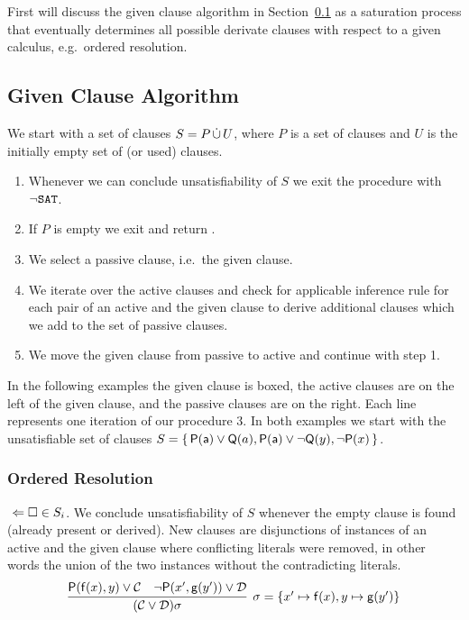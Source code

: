 First will discuss the given clause algorithm in Section~\ref{sec:given:clause:algorithm}
as a saturation process that eventually determines all possible derivate clauses
with respect to a given calculus, e.g.~ordered resolution.

\subsection{Given Clause Algorithm}\label{sec:given:clause:algorithm}

\begin{procedure}
	We start with a set of clauses \( S = P \mathop{\dot\cup} U \),
	where \( P \) is a set of  clauses
	and \( U \) is the initially empty set of  (or used) clauses.
	\begin{enumerate}
		\item[\jek] Whenever we can conclude unsatisfiability of \( S \)
		we exit the procedure with \( \lnot\texttt{SAT} \).
		\setcounter{enumi}{0}
		\item If \( P \) is empty we exit and return \SAT{}.
		\item We select a passive clause, i.e.~the given clause. \hfill\jek{}
		\item We iterate over the active clauses and check for applicable inference rule
		for each pair of an active and the given clause
		to derive additional clauses which we add to the set of passive clauses. \hfill\jek{}
		\item We move the given clause from passive to active and continue with step 1.
	\end{enumerate}
\end{procedure}


In the following examples the given clause is boxed,
the active clauses are on the left of the given clause,
and the passive clauses are on the right.
Each line represents one iteration of our procedure 3.
%
In both examples we start with the unsatisfiable set of clauses
\( S=\{ \, \mathsf{P}(\mathsf{a})\lor\mathsf{Q}(a), \mathsf{P}(\mathsf{a})\lor\lnot\mathsf{Q}(y), \lnot\mathsf{P}(x) \, \} \).

\subsubsection{Ordered Resolution}

\jek{} \( \ \Leftarrow\square\in S_i \). We conclude unsatisfiability of \( S \) whenever the empty clause is found (already present or derived).
New clauses are disjunctions of instances of an active and the given clause where conflicting literals were removed,
in other words the union of the two instances without the contradicting literals.
\begin{gather*}
\infer[\sigma=\{ x'\mapsto\mf(x), y\mapsto\mg(y') \}]{
	(\mcC \lor \mcD)\sigma
}{
	\mP(\mf(x), y) \lor \mcC & \lnot\mP(x',\mg(y')) \lor \mcD
}
\end{gather*}

